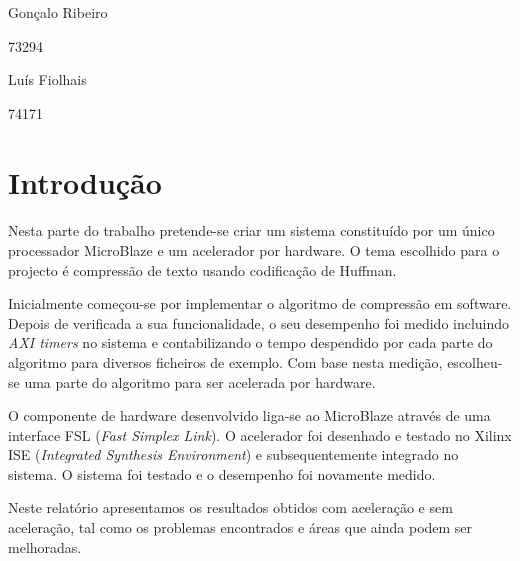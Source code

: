 \documentclass[a4paper]{article}
\begin{document}



	\trSetAuthors
		{
		\begin{center}
		Gonçalo Ribeiro

		73294
		\end{center}
		}{
		\begin{center}
		Luís Fiolhais

		74171
		\end{center}
		}


	\trMakeCover

	\tableofcontents

  \pagebreak

  \setcounter{page}{1}


	\section{Introdução}

	\paragraph{} Nesta parte do trabalho pretende-se criar um sistema constituído por um único processador MicroBlaze e um acelerador por hardware. O tema escolhido para o projecto é compressão de texto usando codificação de Huffman.

	Inicialmente começou-se por implementar o algoritmo de compressão em software. Depois de verificada a sua funcionalidade, o seu desempenho foi medido incluindo \textit{AXI timers} no sistema e contabilizando o tempo despendido por cada parte do algoritmo para diversos ficheiros de exemplo. Com base nesta medição, escolheu-se uma parte do algoritmo para ser acelerada por hardware.

	O componente de hardware desenvolvido liga-se ao MicroBlaze através de uma interface FSL (\textit{Fast Simplex Link}). O acelerador foi desenhado e testado no Xilinx ISE (\textit{Integrated Synthesis Environment}) e subsequentemente integrado no sistema. O sistema foi testado e o desempenho foi novamente medido.

  Neste relatório apresentamos os resultados obtidos com aceleração e sem aceleração, tal como os problemas encontrados e áreas que ainda podem ser melhoradas.
\end{document}
